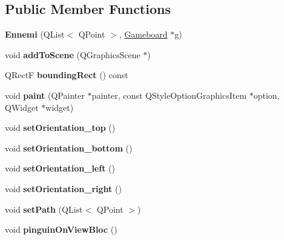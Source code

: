 \subsection*{Public Member Functions}
\begin{DoxyCompactItemize}
\item 
\hypertarget{class_ennemi_af86e9134a1cfd8d878305924702b9d7a}{}{\bfseries Ennemi} (Q\+List$<$ Q\+Point $>$, \hyperlink{class_gameboard}{Gameboard} $\ast$g)\label{class_ennemi_af86e9134a1cfd8d878305924702b9d7a}

\item 
\hypertarget{class_ennemi_ae62d1dcf274319710e7ac4495c95a221}{}void {\bfseries add\+To\+Scene} (Q\+Graphics\+Scene $\ast$)\label{class_ennemi_ae62d1dcf274319710e7ac4495c95a221}

\item 
\hypertarget{class_ennemi_aa00ff90bbb5d71456a23673e77c41bb4}{}Q\+Rect\+F {\bfseries bounding\+Rect} () const \label{class_ennemi_aa00ff90bbb5d71456a23673e77c41bb4}

\item 
\hypertarget{class_ennemi_afbdea6c2e62c2065694a32db0f049325}{}void {\bfseries paint} (Q\+Painter $\ast$painter, const Q\+Style\+Option\+Graphics\+Item $\ast$option, Q\+Widget $\ast$widget)\label{class_ennemi_afbdea6c2e62c2065694a32db0f049325}

\item 
\hypertarget{class_ennemi_a7c509f048996eecb4ee768a044825d15}{}void {\bfseries set\+Orientation\+\_\+top} ()\label{class_ennemi_a7c509f048996eecb4ee768a044825d15}

\item 
\hypertarget{class_ennemi_ab3bbc6381307320c22b1686c5bc59d93}{}void {\bfseries set\+Orientation\+\_\+bottom} ()\label{class_ennemi_ab3bbc6381307320c22b1686c5bc59d93}

\item 
\hypertarget{class_ennemi_ac455b7c41a46dc42a27841b9c566e329}{}void {\bfseries set\+Orientation\+\_\+left} ()\label{class_ennemi_ac455b7c41a46dc42a27841b9c566e329}

\item 
\hypertarget{class_ennemi_a4e99225c7a632efceebba66996d7d9ee}{}void {\bfseries set\+Orientation\+\_\+right} ()\label{class_ennemi_a4e99225c7a632efceebba66996d7d9ee}

\item 
\hypertarget{class_ennemi_a482e9c5ccc0cf1c3aa4e83f32f3eedb1}{}void {\bfseries set\+Path} (Q\+List$<$ Q\+Point $>$)\label{class_ennemi_a482e9c5ccc0cf1c3aa4e83f32f3eedb1}

\item 
\hypertarget{class_ennemi_a6811b0a25a92ec210750072b83d1f74e}{}void {\bfseries pinguin\+On\+View\+Bloc} ()\label{class_ennemi_a6811b0a25a92ec210750072b83d1f74e}

\end{DoxyCompactItemize}
